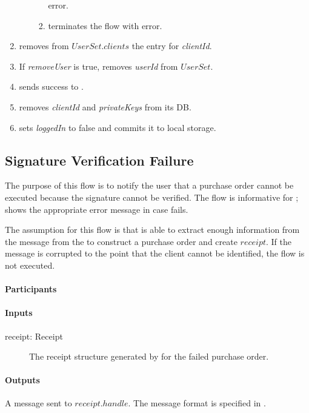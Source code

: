 \documentclass[a4paper,10pt,draft]{article}
\newcommand{\privateKeys}{\emph{privateKeys}}
\newcommand{\userId}{\emph{userId}}
\newcommand{\clientId}{\emph{clientId}}
\newcommand{\loggedIn}{\emph{loggedIn}}
\newcommand{\removeUser}{\emph{removeUser}}
\begin{document}
\begin{enumerate}
\begin{enumerate}
\begin{enumerate}
error.
   \item \Client{} terminates the flow with error.
  \end{enumerate}
 \end{enumerate}
 \item\label{delete_client:first} \Server{} removes from $UserSet.clients$ the 
entry for \clientId{}.
 \item If \removeUser{} is true, \Server{} removes \userId{} from $UserSet$.
 \item \Server{} sends success to \Client{}.
 \item \Client{} removes \clientId{} and \privateKeys{} from its DB.
 \item \Client{} sets \loggedIn{} to false and commits it to local storage.
\end{enumerate}

\subsection{Signature Verification Failure}
\label{signature_failed_flow}
The purpose of this flow is to notify the user that a purchase order cannot be 
executed because the signature cannot be verified. The flow is informative for 
\User{}; \Client{} shows the appropriate error message in case 
 fails.

The assumption for this flow is that \Server{} is able to extract enough 
information from the message from the \Client{} to construct a purchase order 
and create $receipt$. If the message is corrupted to the point that the client 
cannot be identified, the flow is not executed.

\paragraph{Participants} \Server{}

\paragraph{Inputs}
\SpecialItem
\begin{description}
 \item[receipt: Receipt] The receipt structure generated by \Server{} for the 
failed purchase order.
\end{description}

\paragraph{Outputs}
A message sent to $receipt.handle$. The message format is specified 
in \cite{UI_spec}.
\end{document}
